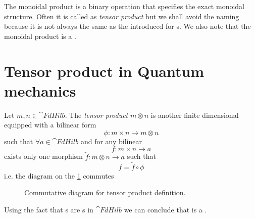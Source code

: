 \begin{remark}
\label{rem:monoidal_product}
The monoidal product is a binary operation that specifies the exact
monoidal structure. Often it is called as \textit{tensor product} but
we shall avoid the naming because it is not always the same as the
 introduced for
s. We also note that the monoidal product is
a . 
\end{remark}

\section{Tensor product in Quantum mechanics}

\begin{definition}
  \label{def:tensor_product}
  Let $m,n \in \cat{FdHilb}$. The \textit{tensor product} $m \otimes n$ is another
  finite dimensional  equipped with a
  bilinear form
  \[
  \phi: m \times n \to m \otimes n
  \]
  such that $\forall a \in \cat{FdHilb}$ and for any
  bilinear
  \[
  f: m \times n \to a
  \]
  exists only one morphism $\tilde{f}: m \otimes n \to a$ such that
  \[
  f = \tilde{f} \circ \phi
  \]
  i.e. the diagram on the \cref{fig:tensor_product} commutes
\begin{figure}[H]
  \centering
  \caption{Commutative diagram for tensor product definition.} 
  \label{fig:tensor_product}
\end{figure}
\end{definition}

\begin{remark}
Using the fact that s are
s in $\cat{FdHilb}$ we can conclude that 
 is a .
\end{remark}

